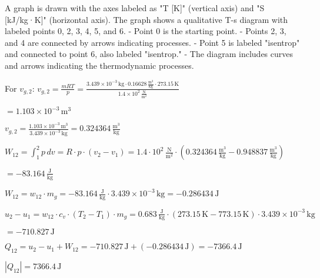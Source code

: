A graph is drawn with the axes labeled as "T [K]" (vertical axis) and "S [kJ/kg·K]" (horizontal axis). The graph shows a qualitative T-s diagram with labeled points 0, 2, 3, 4, 5, and 6.  
- Point 0 is the starting point.  
- Points 2, 3, and 4 are connected by arrows indicating processes.  
- Point 5 is labeled "isentrop" and connected to point 6, also labeled "isentrop."  
- The diagram includes curves and arrows indicating the thermodynamic processes.

For \( v_{g,2} \):  
\( v_{g,2} = \frac{mRT}{p} = \frac{3.439 \times 10^{-3} \, \text{kg} \cdot 0.16628 \, \frac{\text{m}^3}{\text{kg}} \cdot 273.15 \, \text{K}}{1.4 \times 10^2 \, \frac{\text{N}}{\text{m}^2}} \)  

\( = 1.103 \times 10^{-3} \, \text{m}^3 \)  

\( v_{g,2} = \frac{1.103 \times 10^{-3} \, \text{m}^3}{3.439 \times 10^{-3} \, \text{kg}} = 0.324364 \, \frac{\text{m}^3}{\text{kg}} \)  

\( W_{12} = \int_{1}^{2} p \, dv = R \cdot p \cdot (v_{2} - v_{1}) = 1.4 \cdot 10^2 \, \frac{\text{N}}{\text{m}^2} \cdot (0.324364 \, \frac{\text{m}^3}{\text{kg}} - 0.948837 \, \frac{\text{m}^3}{\text{kg}}) \)  

\( = -83.164 \, \frac{\text{J}}{\text{kg}} \)  

\( W_{12} = w_{12} \cdot m_{g} = -83.164 \, \frac{\text{J}}{\text{kg}} \cdot 3.439 \times 10^{-3} \, \text{kg} = -0.286434 \, \text{J} \)  

\( u_{2} - u_{1} = w_{12} \cdot c_{v} \cdot (T_{2} - T_{1}) \cdot m_{g} = 0.683 \, \frac{\text{J}}{\text{kg}} \cdot (273.15 \, \text{K} - 773.15 \, \text{K}) \cdot 3.439 \times 10^{-3} \, \text{kg} \)  

\( = -710.827 \, \text{J} \)  

\( Q_{12} = u_{2} - u_{1} + W_{12} = -710.827 \, \text{J} + (-0.286434 \, \text{J}) = -7366.4 \, \text{J} \)  

\( |Q_{12}| = 7366.4 \, \text{J} \)